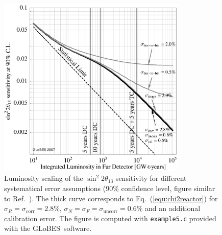 \documentclass[12pt,a4paper]{article}
\newcommand{\capdef}{}
\newcommand{\mycaption}[2][\capdef]{\renewcommand{\capdef}{#2}%
       \caption[#1]{{\footnotesize #2}}}
\newcommand{\eq}{Eq.}
\newcommand{\Ref}{Ref.}
\newcommand{\stheta}{\sin^2 2 \theta_{13}}
\newcommand{\GLOBES}{{\sf GLoBES}}
\newcommand{\equ}[1]{\eq~(\ref{equ:#1})}
\begin{document}
\begin{figure}[t]
\begin{center}
\includegraphics[width=9cm]{reactor}
\end{center}
\mycaption{\label{fig:reactor} Luminosity scaling of the $\stheta$ sensitivity for different systematical error assumptions (90\% confidence level, figure similar to \Ref~\cite{Huber:2006vr}). The thick curve corresponds to \equ{chi2reactor} for $\sigma_R=\sigma_{\mathrm{corr}}=2.8\%$, $\sigma_N=\sigma_F=\sigma_{\mathrm{uncorr}}=0.6\%$ and an additional calibration error. The figure is computed with {\tt example5.c} provided with the \GLOBES\ software.}
\end{figure}
\end{document}
